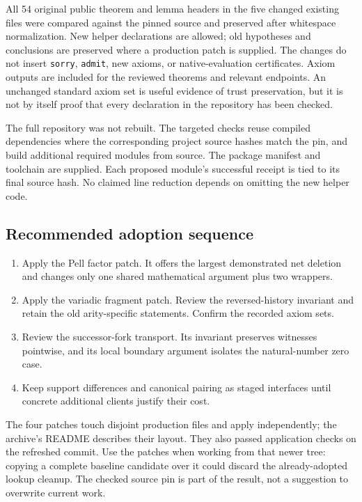 \documentclass[11pt]{article}
\theoremstyle{remark}\newtheorem{remark}[proposition]{Remark}
\newcommand{\code}[1]{\nolinkurl{#1}}
\begin{document}
All 54 original public theorem and lemma headers in the five changed existing files were compared against the pinned source and preserved after whitespace normalization. New helper declarations are allowed; old hypotheses and conclusions are preserved where a production patch is supplied. The changes do not insert \code{sorry}, \code{admit}, new axioms, or native-evaluation certificates. Axiom outputs are included for the reviewed theorems and relevant endpoints. An unchanged standard axiom set is useful evidence of trust preservation, but it is not by itself proof that every declaration in the repository has been checked.

The full repository was not rebuilt. The targeted checks reuse compiled dependencies where the corresponding project source hashes match the pin, and build additional required modules from source. The package manifest and toolchain are supplied. Each proposed module's successful receipt is tied to its final source hash. No claimed line reduction depends on omitting the new helper code.

\subsection{Recommended adoption sequence}

\begin{enumerate}
\item Apply the Pell factor patch. It offers the largest demonstrated net deletion and changes only one shared mathematical argument plus two wrappers.
\item Apply the variadic fragment patch. Review the reversed-history invariant and retain the old arity-specific statements. Confirm the recorded axiom sets.
\item Review the successor-fork transport. Its invariant preserves witnesses pointwise, and its local boundary argument isolates the natural-number zero case.
\item Keep support differences and canonical pairing as staged interfaces until concrete additional clients justify their cost.
\end{enumerate}

The four patches touch disjoint production files and apply independently; the archive's README describes their layout. They also passed application checks on the refreshed commit. Use the patches when working from that newer tree: copying a complete baseline candidate over it could discard the already-adopted lookup cleanup. The checked source pin is part of the result, not a suggestion to overwrite current work.
\end{document}
